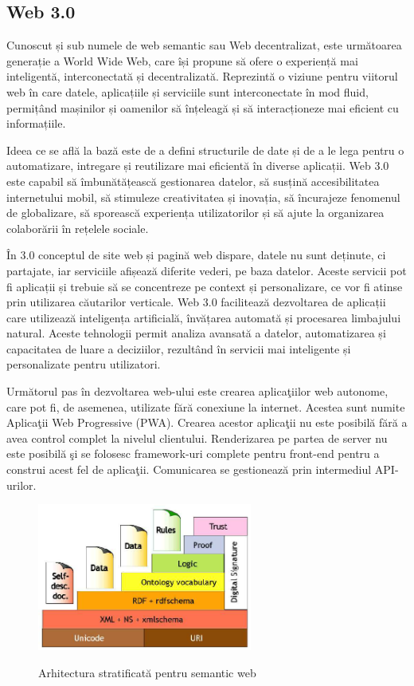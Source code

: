 \documentclass[12pt, a4paper]{report}
\begin{document}
\subsection{Web 3.0}

Cunoscut și sub numele de web semantic sau Web decentralizat, este următoarea generație a World Wide Web, care își propune să ofere o experiență mai inteligentă, interconectată și decentralizată. Reprezintă o viziune pentru viitorul web în care datele, aplicațiile și serviciile sunt interconectate în mod fluid, permițând mașinilor și oamenilor să înțeleagă și să interacționeze mai eficient cu informațiile.

Ideea ce se află la bază este de a defini structurile de date și de a le lega pentru o automatizare, intregare și reutilizare mai eficientă în diverse aplicații. Web 3.0 este capabil să îmbunătățească gestionarea datelor, să susțină accesibilitatea internetului mobil, să stimuleze creativitatea și inovația, să încurajeze fenomenul de globalizare, să sporească experiența utilizatorilor și să ajute la organizarea colaborării în rețelele sociale.

În 3.0 conceptul de site web și pagină web dispare, datele nu sunt deținute, ci partajate, iar serviciile afișează diferite vederi, pe baza datelor. Aceste servicii pot fi aplicații și trebuie să se concentreze pe context și personalizare, ce vor fi atinse prin utilizarea căutarilor verticale. Web 3.0 facilitează dezvoltarea de aplicații care utilizează inteligența artificială, învățarea automată și procesarea limbajului natural. Aceste tehnologii permit analiza avansată a datelor, automatizarea și capacitatea de luare a deciziilor, rezultând în servicii mai inteligente și personalizate pentru utilizatori.

Urm\u atorul pas \^ in dezvoltarea web-ului este crearea aplica\c tiilor web autonome, care pot fi, de asemenea, utilizate f\u ar\u a conexiune la internet. Acestea sunt numite Aplica\c tii Web Progressive (PWA). Crearea acestor aplica\c tii nu este posibil\u a f\u ar\u a a avea control complet la nivelul clientului. Renderizarea pe partea de server nu este posibil\u a \c si se folosesc framework-uri complete pentru front-end pentru a construi acest fel de aplica\c tii. Comunicarea se gestioneaz\u a prin intermediul API-urilor.\cite{pwa}


\begin{figure}[htbp]
	\centering
	\includegraphics[width=0.63\textwidth]{layered_architecture.png} \label{fig:layered}
	\caption{Arhitectura stratificată pentru semantic web}
\end{figure}
\end{document}

